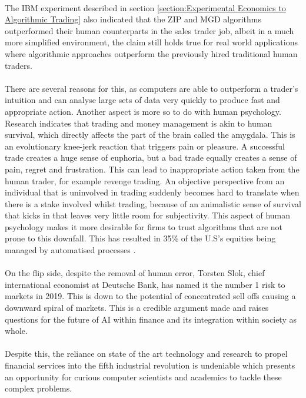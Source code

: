 \documentclass[ %
                    author={Ashwinder Khurana},
                supervisor={Prof Dave Cliff},
                    degree={MEng},
                     title={The Deeply Reinforced Trader},
                  subtitle={},
                      type={enterprise},
                      year={2020} ]{dissertation}
\begin{document}
\\
\noindent The IBM experiment described in section \ref{section:Experimental Economics to Algorithmic Trading} also indicated that the ZIP and MGD algorithms outperformed their human counterparts in the sales trader job, albeit in a much more simplified environment, the claim still holds true for real world applications where algorithmic approaches outperform the previously hired traditional human traders. 
\\
\\
There are several reasons for this, as computers are able to outperform a trader's intuition and can analyse large sets of data very quickly to produce fast and appropriate action. Another aspect is more so to do with human psychology. 
Research indicates\cite{quora-trading-hard} that trading and money management is akin to human survival, which directly affects the part of the brain called the amygdala. This is an evolutionary knee-jerk reaction that triggers pain or pleasure. A successful trade creates a huge sense of euphoria, but a bad trade equally creates a sense of pain, regret and frustration. This can lead to inappropriate action taken from the human trader, for example revenge trading. An objective perspective from an individual that is uninvolved in trading suddenly becomes hard to translate when there is a stake involved whilst trading, because of an animalistic sense of survival that kicks in that leaves very little room for subjectivity. This aspect of human psychology makes it more desirable for firms to trust algorithms that are not prone to this downfall. This has resulted in 35\% of the U.S's equities being managed by automatised processes \cite{https://www.statista.com/chart/20245/share-of-computerized-and-human-trading-in-us-equities/}. 
\\
\\
On the flip side, despite the removal of human error, Torsten Slok, chief international economist at Deutsche Bank, has named it the number 1 risk to markets in 2019\cite{https://www.statista.com/chart/20245/share-of-computerized-and-human-trading-in-us-equities/}. This is down to the potential of concentrated sell offs causing a downward spiral of markets. This is a credible argument made and raises questions for the future of AI within finance and its integration within society as whole.
\\
\\
Despite this, the reliance on state of the art technology and research to propel financial services into the fifth industrial revolution is undeniable which presents an opportunity for curious computer scientists and academics to tackle these complex problems. 
\end{document}
